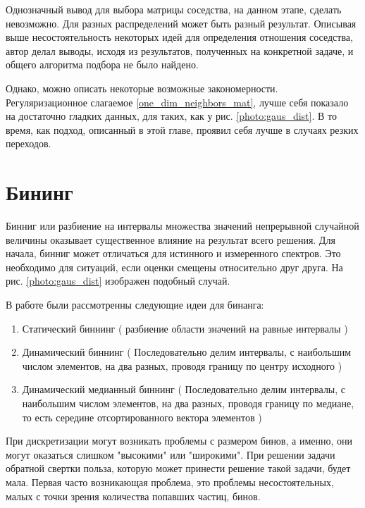 \documentclass[a4paper,12pt]{diplom}
\begin{document}
Однозначный вывод для выбора матрицы соседства, на данном этапе, сделать невозможно. Для разных распределений может быть разный результат. 
Описывая выше несостоятельность некоторых идей для определения отношения соседства, автор делал выводы, исходя из результатов, полученных на 
конкретной задаче, и общего алгоритма подбора не было найдено.

Однако, можно описать некоторые возможные закономерности. Регуляризационное слагаемое \eqref{one_dim_neighbors_mat}, лучше себя показало на 
достаточно гладких данных, для таких, как у рис. \ref{photo:gaus_dist}. В то время, как подход, описанный в этой главе, проявил себя лучше в 
случаях резких переходов.


\chapter{Бининг}

Бинниг или разбиение на интервалы множества значений непрерывной случайной величины оказывает существенное влияние на результат всего решения.
Для начала, бинниг может отличаться для истинного и измеренного спектров. Это необходимо для ситуаций, если оценки смещены относительно друг друга. 
На рис. \ref{photo:gaus_dist} изображен подобный случай.

В работе были рассмотренны следующие идеи для бинанга:

\begin{enumerate}
   \item Статический биннинг ( разбиение области значений на равные интервалы ) \\
   
   \item Динамический биннинг ( Последовательно делим интервалы, с наибольшим числом элементов, 
   на два разных, проводя границу по центру исходного ) \\

   \item Динамический медианный биннинг ( Последовательно делим интервалы, с наибольшим числом элементов, 
   на два разных, проводя границу по медиане, то есть середине отсортированного вектора элементов )
\end{enumerate}


При дискретизации могут возникать проблемы с размером бинов, а именно, они могут оказаться слишком "высокими" или "широкими". При решении задачи 
обратной свертки польза, которую может принести решение такой задачи, будет мала. Первая часто возникающая проблема, это проблемы несостоятельных,
малых с точки зрения количества попавших частиц, бинов. 
\end{document}
